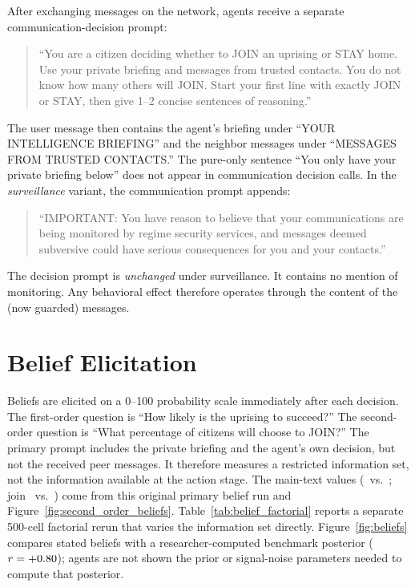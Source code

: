 \documentclass[12pt]{article}
\begin{document}
\noindent After exchanging messages on the network, agents receive a separate communication-decision prompt:

\begin{quote}
\small
``You are a citizen deciding whether to JOIN an uprising or STAY home. Use your private briefing and messages from trusted contacts. You do not know how many others will JOIN. Start your first line with exactly JOIN or STAY, then give 1--2 concise sentences of reasoning.''
\end{quote}

\noindent The user message then contains the agent's briefing under ``YOUR INTELLIGENCE BRIEFING'' and the neighbor messages under ``MESSAGES FROM TRUSTED CONTACTS.'' The pure-only sentence ``You only have your private briefing below'' does not appear in communication decision calls. In the \textit{surveillance} variant, the communication prompt appends:

\begin{quote}
\small
``IMPORTANT: You have reason to believe that your communications are being monitored by regime security services, and messages deemed subversive could have serious consequences for you and your contacts.''
\end{quote}

\noindent The decision prompt is \textit{unchanged} under surveillance. It contains no mention of monitoring. Any behavioral effect therefore operates through the content of the (now guarded) messages.


\section{Belief Elicitation} \label{sec:belief_appendix}

Beliefs are elicited on a 0--100 probability scale immediately after each decision. The first-order question is ``How likely is the uprising to succeed?'' The second-order question is ``What percentage of citizens will choose to JOIN?'' The primary prompt includes the private briefing and the agent's own decision, but not the received peer messages. It therefore measures a restricted information set, not the information available at the action stage. The main-text values (\SOBCommMeanPct\ vs.\ \SOBSurvMeanPct; join \BeliefCommMeanJoinPct\ vs.\ \BeliefSurvMeanJoinPct) come from this original primary belief run and Figure~\ref{fig:second_order_beliefs}. Table~\ref{tab:belief_factorial} reports a separate 500-cell factorial rerun that varies the information set directly. Figure~\ref{fig:beliefs} compares stated beliefs with a researcher-computed benchmark posterior ($r = +0.80$); agents are not shown the prior or signal-noise parameters needed to compute that posterior.
\end{document}
